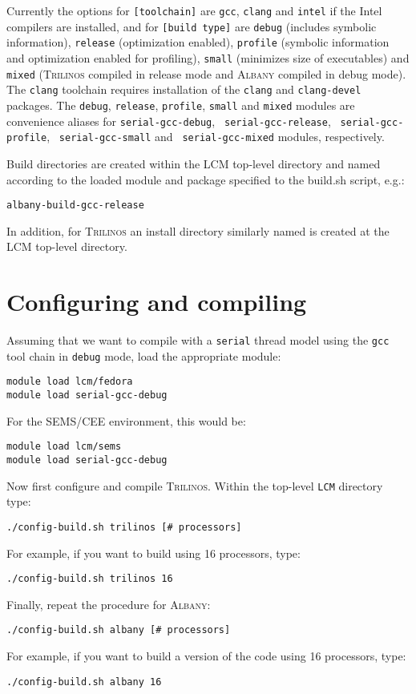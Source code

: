 \documentclass{article}
\newcommand{\trilinos}{\textsc{Trilinos}}
\newcommand{\albany}{\textsc{Albany}}
\newcommand{\lcm}{\textsc{LCM}}
\begin{document}
Currently the options for \verb+[toolchain]+ are \verb+gcc+,
\verb+clang+ and \verb+intel+ if the Intel compilers are installed,
and for \verb+[build type]+ are \verb+debug+ (includes symbolic
information), \verb+release+ (optimization enabled), \verb+profile+
(symbolic information and optimization enabled for profiling),
\verb+small+ (minimizes size of executables) and \verb+mixed+
(\trilinos{} compiled in release mode and \albany{} compiled in debug
mode). The \verb+clang+ toolchain requires installation of the
\verb+clang+ and \verb+clang-devel+ packages. The \verb+debug+,
\verb+release+, \verb+profile+, \verb+small+ and \verb+mixed+ modules
are convenience aliases for \verb+serial-gcc-debug+,
\verb+ serial-gcc-release+, \verb+ serial-gcc-profile+,
\verb+ serial-gcc-small+ and \verb+ serial-gcc-mixed+ modules,
respectively.

Build directories are created within the \lcm{} top-level directory
and named according to the loaded module and package specified to the
build.sh script, e.g.:
\begin{verbatim}
albany-build-gcc-release
\end{verbatim}
In addition, for \trilinos{} an install directory similarly named is
created at the \lcm{} top-level directory.

\section{Configuring and compiling}

Assuming that we want to compile with a \verb+serial+ thread model
using the \verb+gcc+ tool chain in \verb+debug+ mode, load the
appropriate module:
\begin{verbatim}
module load lcm/fedora
module load serial-gcc-debug
\end{verbatim}
For the SEMS/CEE environment, this would be:
\begin{verbatim}
module load lcm/sems
module load serial-gcc-debug
\end{verbatim}
Now first configure and compile \trilinos{}. Within the top-level
\verb+LCM+ directory type:
\begin{verbatim}
./config-build.sh trilinos [# processors]
\end{verbatim}
For example, if you want to build using 16 processors, type:
\begin{verbatim}
./config-build.sh trilinos 16
\end{verbatim}
Finally, repeat the procedure for \albany{}:
\begin{verbatim}
./config-build.sh albany [# processors]
\end{verbatim}
For example, if you want to build a version of the code using 16
processors, type:
\begin{verbatim}
./config-build.sh albany 16
\end{verbatim}
\end{document}
